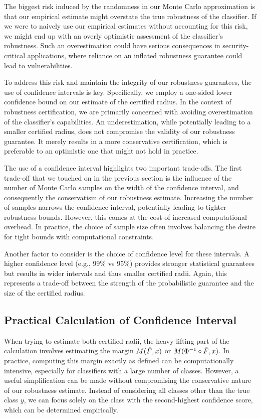 The biggest risk induced by the randomness in our Monte Carlo approximation is that our empirical estimate might overstate the true robustness of the classifier.
If we were to naively use our empirical estimates without accounting for this risk, we might end up with an overly optimistic assessment of the classifier's robustness.
Such an overestimation could have serious consequences in security-critical applications, where reliance on an inflated robustness guarantee could lead to vulnerabilities.

To address this risk and maintain the integrity of our robustness guarantees, the use of confidence intervals is key.
Specifically, we employ a one-sided lower confidence bound on our estimate of the certified radius.
In the context of robustness certification, we are primarily concerned with avoiding overestimation of the classifier's capabilities.
An underestimation, while potentially leading to a smaller certified radius, does not compromise the validity of our robustness guarantee.
It merely results in a more conservative certification, which is preferable to an optimistic one that might not hold in practice.

The use of a confidence interval highlights two important trade-offs.
The first trade-off that we touched on in the previous section is the influence of the number of Monte Carlo samples on the width of the confidence interval, and consequently the conservatism of our robustness estimate.
Increasing the number of samples narrows the confidence interval, potentially leading to tighter robustness bounds.
However, this comes at the cost of increased computational overhead.
In practice, the choice of sample size often involves balancing the desire for tight bounds with computational constraints.

Another factor to consider is the choice of confidence level for these intervals.
A higher confidence level (e.g., 99\% vs 95\%) provides stronger statistical guarantees but results in wider intervals and thus smaller certified radii.
Again, this represents a trade-off between the strength of the probabilistic guarantee and the size of the certified radius.

\subsection{Practical Calculation of Confidence Interval}\label{subsec:practical-calculation-of-confidence-interval}

When trying to estimate both certified radii, the heavy-lifting part of the calculation involves estimating the margin $M(\Hat{F},x)$ or $M(\Phi^{-1}\circ\Hat{F},x)$.
In practice, computing this margin exactly as defined can be computationally intensive, especially for classifiers with a large number of classes.
However, a useful simplification can be made without compromising the conservative nature of our robustness estimate.
Instead of considering all classes other than the true class $y$, we can focus solely on the class with the second-highest confidence score, which can be determined empirically.

